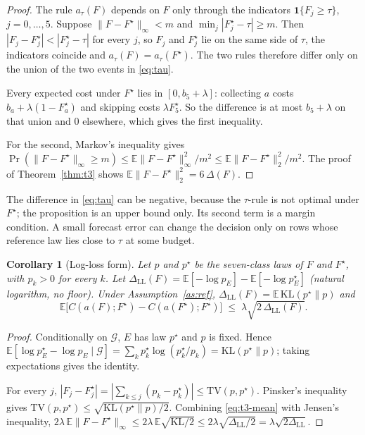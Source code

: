 \documentclass[10pt]{article}
\newtheorem{corollary}{Corollary}
\begin{document}
\begin{proof}
The rule $a_\tau(F)$ depends on $F$ only through the indicators $\mathbf 1\{F_j\ge\tau\}$, $j=0,\dots,5$. Suppose $\|F-F^\star\|_\infty<m$ and $\min_j|F^\star_j-\tau|\ge m$. Then $|F_j-F^\star_j|<|F^\star_j-\tau|$ for every $j$, so $F_j$ and $F^\star_j$ lie on the same side of $\tau$, the indicators coincide and $a_\tau(F)=a_\tau(F^\star)$. The two rules therefore differ only on the union of the two events in \eqref{eq:tau}.

Every expected cost under $F^\star$ lies in $[0,b_5+\lambda]$: collecting $a$ costs $b_a+\lambda(1-F^\star_a)$ and skipping costs $\lambda F^\star_5$. So the difference is at most $b_5+\lambda$ on that union and $0$ elsewhere, which gives the first inequality.

For the second, Markov's inequality gives $\Pr(\|F-F^\star\|_\infty\ge m)\le\mathbb E\|F-F^\star\|_\infty^2/m^2\le\mathbb E\|F-F^\star\|_2^2/m^2$. The proof of Theorem~\ref{thm:t3} shows $\mathbb E\|F-F^\star\|_2^2=6\,\Delta(F)$.
\end{proof}

\noindent The difference in \eqref{eq:tau} can be negative, because the $\tau$-rule is not optimal under $F^\star$; the proposition is an upper bound only. Its second term is a margin condition. A small forecast error can change the decision only on rows whose reference law lies close to $\tau$ at some budget.

\begin{corollary}[Log-loss form]\label{cor:ll}
Let $p$ and $p^\star$ be the seven-class laws of $F$ and $F^\star$, with $p_k>0$ for every $k$. Let $\Delta_{\mathrm{LL}}(F)=\mathbb E[-\log p_E]-\mathbb E[-\log p^\star_E]$ (natural logarithm, no floor). Under Assumption~\ref{as:ref}, $\Delta_{\mathrm{LL}}(F)=\mathbb E\,\mathrm{KL}(p^\star\|p)$ and
\begin{equation}
\mathbb E\bigl[C(a(F);F^\star)-C(a(F^\star);F^\star)\bigr]\;\le\;\lambda\sqrt{2\,\Delta_{\mathrm{LL}}(F)} .
\end{equation}
\end{corollary}

\begin{proof}
Conditionally on $\mathcal G$, $E$ has law $p^\star$ and $p$ is fixed. Hence $\mathbb E[\log p^\star_E-\log p_E\mid\mathcal G]=\sum_kp^\star_k\log(p^\star_k/p_k)=\mathrm{KL}(p^\star\|p)$; taking expectations gives the identity.

For every $j$, $|F_j-F^\star_j|=|\sum_{k\le j}(p_k-p^\star_k)|\le\mathrm{TV}(p,p^\star)$. Pinsker's inequality gives $\mathrm{TV}(p,p^\star)\le\sqrt{\mathrm{KL}(p^\star\|p)/2}$. Combining \eqref{eq:t3-mean} with Jensen's inequality, $2\lambda\,\mathbb E\|F-F^\star\|_\infty\le2\lambda\,\mathbb E\sqrt{\mathrm{KL}/2}\le2\lambda\sqrt{\Delta_{\mathrm{LL}}/2}=\lambda\sqrt{2\Delta_{\mathrm{LL}}}$.
\end{proof}
\end{document}
